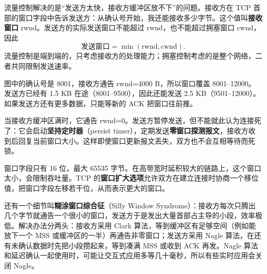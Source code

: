 流量控制解决的是“发送方太快，接收方缓冲区放不下”的问题。接收方在 TCP 首部的窗口字段中告诉发送方：从确认号开始，我还能接收多少字节。这个值叫\textbf{接收窗口} rwnd。发送方的实际发送窗口不能超过 rwnd，也不能超过拥塞窗口 cwnd，因此
\[
\text{发送窗口}=\min(\mathrm{rwnd},\mathrm{cwnd}).
\]
流量控制是端到端的，只考虑接收方的处理能力；拥塞控制考虑的是整个网络，二者共同限制发送速率。

\begin{center}
\end{center}

图中的确认号是 8001，接收方通告 rwnd=4000 B，所以窗口覆盖 8001--12000。发送方已经有 1.5 KB 在途（8001--9500），因此还能发送 2.5 KB（9501--12000）。如果发送方还有更多数据，只能等新的 ACK 把窗口往前推。

当接收方缓冲区满时，它通告 rwnd=0。发送方暂停发送，但不能就此认为连接死了：它会启动\textbf{坚持定时器}（persist timer），定期发送\textbf{零窗口探测报文}，接收方收到后回复当前窗口大小。这样即使窗口更新报文丢失，双方也不会互相等待而死锁。

窗口字段只有 16 位，最大 65535 字节。在高带宽时延积较大的链路上，这个窗口太小，会限制吞吐量。TCP 的\textbf{窗口扩大选项}允许双方在建立连接时协商一个移位值，把窗口字段左移若干位，从而表示更大的窗口。

还有一个细节叫\textbf{糊涂窗口综合征}（Silly Window Syndrome）：接收方每次只腾出几个字节就通告一个很小的窗口，发送方于是发出大量首部占主导的小段，效率极低。解决办法分两头：接收方采用 Clark 算法，等到缓冲区有足够空间（例如能放下一个 MSS 或缓冲区的一半）再通告非零窗口；发送方采用 Nagle 算法，在还有未确认数据时先把小段攒起来，等到凑满 MSS 或收到 ACK 再发。Nagle 算法和延迟确认一起使用时，可能让交互式应用多等几十毫秒，所以有些实时应用会关闭 Nagle。


